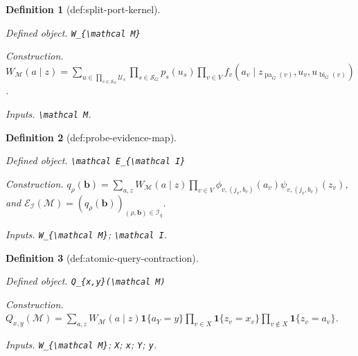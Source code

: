 \documentclass{article}
\newtheorem{definition}{Definition}
\begin{document}
\begin{definition}[def:split-port-kernel]\label{def:split-port-kernel}
\par\smallskip\noindent\emph{Defined object.} \texttt{W\_\allowbreak{}\{\textbackslash{}\allowbreak{}mathcal M\}\allowbreak{}}
\par\smallskip\noindent\emph{Construction.} \(W_{\mathcal M}(a\mid z)=\sum_{u\in\prod_{s\in\mathcal S_G}\mathcal U_s}\prod_{s\in\mathcal S_G}p_s(u_s)\prod_{v\in V}f_v(a_v\mid z_{\operatorname{pa}_G(v)},u_v,u_{\operatorname{bi}_G(v)})\).
\par\smallskip\noindent\emph{Inputs.} \texttt{\textbackslash{}\allowbreak{}mathcal M}.
\end{definition}

\begin{definition}[def:probe-evidence-map]\label{def:probe-evidence-map}
\par\smallskip\noindent\emph{Defined object.} \texttt{\textbackslash{}\allowbreak{}mathcal E\_\allowbreak{}\{\textbackslash{}\allowbreak{}mathcal I\}\allowbreak{}}
\par\smallskip\noindent\emph{Construction.} \(q_{\rho}(\boldsymbol b)=\sum_{a,z}W_{\mathcal M}(a\mid z)\prod_{v\in V}\phi_{v,(j_v,b_v)}(a_v)\psi_{v,(j_v,b_v)}(z_v)\), and \(\mathcal E_{\mathcal I}(\mathcal M)=(q_{\rho}(\boldsymbol b))_{(\rho,\boldsymbol b)\in\mathcal I_q}\).
\par\smallskip\noindent\emph{Inputs.} \texttt{W\_\allowbreak{}\{\textbackslash{}\allowbreak{}mathcal M\}\allowbreak{}}; \texttt{\textbackslash{}\allowbreak{}mathcal I}.
\end{definition}

\begin{definition}[def:atomic-query-contraction]\label{def:atomic-query-contraction}
\par\smallskip\noindent\emph{Defined object.} \texttt{Q\_\allowbreak{}\{x,\allowbreak{}y\}\allowbreak{}(\textbackslash{}\allowbreak{}mathcal M)}
\par\smallskip\noindent\emph{Construction.} \(Q_{x,y}(\mathcal M)=\sum_{a,z}W_{\mathcal M}(a\mid z)\mathbf 1\{a_Y=y\}\prod_{v\in X}\mathbf 1\{z_v=x_v\}\prod_{v\notin X}\mathbf 1\{z_v=a_v\}\).
\par\smallskip\noindent\emph{Inputs.} \texttt{W\_\allowbreak{}\{\textbackslash{}\allowbreak{}mathcal M\}\allowbreak{}}; \texttt{X}; \texttt{x}; \texttt{Y}; \texttt{y}.
\end{definition}
\end{document}
